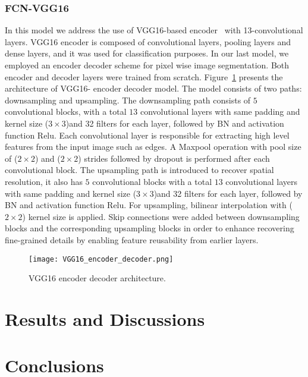 \documentclass[preprint,9pt]{elsarticle}
\begin{document}
\subsubsection{FCN-VGG16}
In this model we address the use of VGG16-based encoder~\cite{Simonyan2015} with 13-convolutional layers.
VGG16 encoder is composed of convolutional layers, pooling layers and dense layers, and it was used for classification purposes. 
In our last model, we employed an encoder decoder scheme for pixel wise image segmentation. 
Both encoder and decoder layers were trained from scratch.
Figure~\ref{vgg16} presents the architecture of VGG16- encoder decoder model. 
The model consists of two paths: downsampling and upsampling.
The downsampling path consists of \(5\) convolutional blocks,  with a total \(13\) convolutional layers  with same padding and kernel size (\(3\times3\))and 32 filters for each layer, followed by BN and activation function Relu.
Each convolutional layer is responsible for extracting high level features from the input image such as edges.
A Maxpool operation with pool size of (\(2\times2\))  and (\(2\times2\)) strides followed by dropout is performed after each convolutional block. 
The upsampling path is introduced to recover spatial resolution, it also has \(5\) convolutional blocks with a total \(13\) convolutional layers  with same padding and kernel size (\(3\times3\))and 32 filters for each layer, followed by BN and activation function Relu.
For upsampling, bilinear interpolation with (\(2\times2\)) kernel size is applied.
Skip connections were added between downsampling blocks and the corresponding upsampling blocks in order to enhance recovering fine-grained details by enabling feature reusability from earlier layers.
\begin{figure} [h!]
	\begin{center}
		\texttt{[image: VGG16\_encoder\_decoder.png]}
	\end{center}
	\caption{VGG16 encoder decoder architecture.} 
	\label{vgg16}
\end{figure}


\section{Results and Discussions}

\section{Conclusions}
	



\section*{}

	
\section*{ }
{}

	
	
\end{document}
